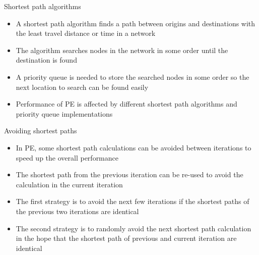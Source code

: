 \documentclass[final]{beamer}
\begin{document}
\begin{frame}{ }
\begin{columns}[t]
\begin{column}{.26\linewidth}
        \begin{block}{Shortest path algorithms}
            \begin{itemize}
                \itemsep.4em
                \item A shortest path algorithm finds a path between origins and destinations with the least travel distance or time in a network
                \item The algorithm searches nodes in the network in some order until the destination is found
               \item A \alert{priority queue} is needed to store the searched nodes in some order so the next location to search can be found easily
                \item Performance of PE is affected by different shortest path algorithms and priority queue implementations 
            \end{itemize}
        \end{block}

        \begin{block}{Avoiding shortest paths}
            \begin{itemize}
                \itemsep.4em
                \item In PE, \alert{some shortest path calculations can be avoided} between iterations to speed up the overall performance
                \item The shortest path from the previous iteration can be \alert{re-used} to \alert{avoid} the calculation in the current iteration
                \item The first strategy is to \alert{avoid the next few iterations} if the shortest paths of the previous two iterations are identical
                \item The second strategy is to \alert{randomly avoid} the next shortest path calculation in the hope that the shortest path of previous and current iteration are identical
            \end{itemize}
        \end{block}


\end{column}
\end{columns}
\end{frame}
\end{document}
